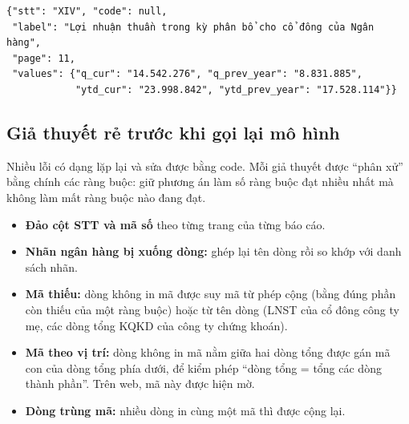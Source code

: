 \documentclass[12pt,a4paper]{report}
\newcommand{\enquote}[1]{“#1”}
\begin{document}
\begin{center}
\label{lst:json}
\begin{Verbatim}[frame=single,fontsize=\small]
{"stt": "XIV", "code": null,
 "label": "Lợi nhuận thuần trong kỳ phân bổ cho cổ đông của Ngân hàng",
 "page": 11,
 "values": {"q_cur": "14.542.276", "q_prev_year": "8.831.885",
            "ytd_cur": "23.998.842", "ytd_prev_year": "17.528.114"}}
\end{Verbatim}
\end{center}

\subsection{Giả thuyết rẻ trước khi gọi lại mô hình}
Nhiều lỗi có dạng lặp lại và sửa được bằng code. Mỗi giả thuyết được \enquote{phân xử} bằng chính các ràng buộc: giữ
phương án làm số ràng buộc đạt nhiều nhất mà không làm mất ràng buộc nào đang đạt.
\begin{itemize}
  \item \textbf{Đảo cột STT và mã số} theo từng trang của từng báo cáo.
  \item \textbf{Nhãn ngân hàng bị xuống dòng:} ghép lại tên dòng rồi so khớp với danh sách nhãn.
  \item \textbf{Mã thiếu:} dòng không in mã được suy mã từ phép cộng (bằng đúng phần còn thiếu của một ràng buộc) hoặc
        từ tên dòng (LNST của cổ đông công ty mẹ, các dòng tổng KQKD của công ty chứng khoán).
  \item \textbf{Mã theo vị trí:} dòng không in mã nằm giữa hai dòng tổng được gán mã con của dòng tổng phía dưới, để kiểm
        phép \enquote{dòng tổng = tổng các dòng thành phần}. Trên web, mã này được hiện mờ.
  \item \textbf{Dòng trùng mã:} nhiều dòng in cùng một mã thì được cộng lại.
\end{itemize}
\end{document}
